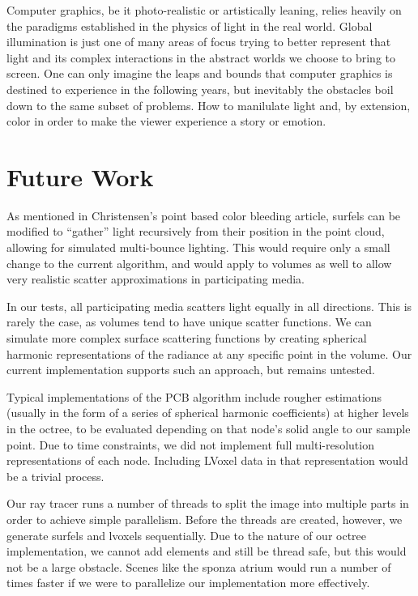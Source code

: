 \documentclass[12pt]{ucthesis}
\begin{document}
Computer graphics, be it photo-realistic or artistically leaning, relies heavily on the paradigms established in the physics of light in the real world.  Global illumination is just one of many areas of focus trying to better represent that light and its complex interactions in the abstract worlds we choose to bring to screen.  One can only imagine the leaps and bounds that computer graphics is destined to experience in the following years, but inevitably the obstacles boil down to the same subset of problems.  How to manilulate light and, by extension, color in order to make the viewer experience a story or emotion.

\chapter{Future Work}


As mentioned in Christensen's point based color bleeding article, surfels can be modified to ``gather'' light recursively from their position in the point cloud, allowing for simulated multi-bounce lighting.  This would require only a small change to the current algorithm, and would apply to volumes as well to allow very realistic scatter approximations in participating media.

\vspace{5mm}

In our tests, all participating media scatters light equally in all directions.  This is rarely the case, as volumes tend to have unique scatter functions.  We can simulate more complex surface scattering functions by creating spherical harmonic representations of the radiance at any specific point in the volume.  Our current implementation supports such an approach, but remains untested.

\vspace{5mm}

Typical implementations of the PCB algorithm include rougher estimations (usually in the form of a series of spherical harmonic coefficients) at higher levels in the octree, to be evaluated depending on that node's solid angle to our sample point.  Due to time constraints, we did not implement full multi-resolution representations of each node.  Including LVoxel data in that representation would be a trivial process.

\vspace{5mm}

Our ray tracer runs a number of threads to split the image into multiple parts  in order to achieve simple parallelism.  Before the threads are created, however, we generate surfels and lvoxels sequentially.  Due to the nature of our octree implementation, we cannot add elements and still be thread safe, but this would not be a large obstacle.  Scenes like the sponza atrium would run a number of times faster if we were to parallelize our implementation more effectively.
\end{document}
